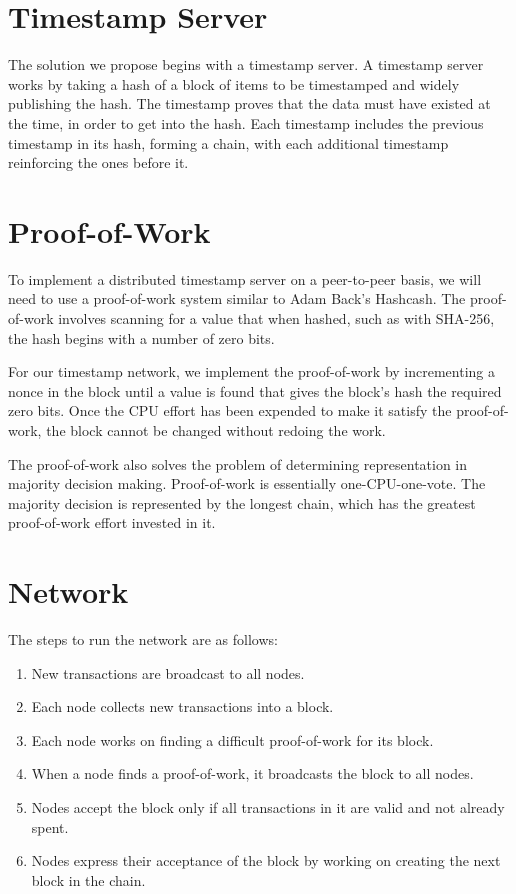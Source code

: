 \documentclass{article}
\begin{document}
\section{Timestamp Server}

The solution we propose begins with a timestamp server. A timestamp server works by taking a hash of a block of items to be timestamped and widely publishing the hash. The timestamp proves that the data must have existed at the time, in order to get into the hash. Each timestamp includes the previous timestamp in its hash, forming a chain, with each additional timestamp reinforcing the ones before it.

\section{Proof-of-Work}

To implement a distributed timestamp server on a peer-to-peer basis, we will need to use a proof-of-work system similar to Adam Back's Hashcash. The proof-of-work involves scanning for a value that when hashed, such as with SHA-256, the hash begins with a number of zero bits.

For our timestamp network, we implement the proof-of-work by incrementing a nonce in the block until a value is found that gives the block's hash the required zero bits. Once the CPU effort has been expended to make it satisfy the proof-of-work, the block cannot be changed without redoing the work.

The proof-of-work also solves the problem of determining representation in majority decision making. Proof-of-work is essentially one-CPU-one-vote. The majority decision is represented by the longest chain, which has the greatest proof-of-work effort invested in it.

\section{Network}

The steps to run the network are as follows:

\begin{enumerate}
\item New transactions are broadcast to all nodes.
\item Each node collects new transactions into a block.
\item Each node works on finding a difficult proof-of-work for its block.
\item When a node finds a proof-of-work, it broadcasts the block to all nodes.
\item Nodes accept the block only if all transactions in it are valid and not already spent.
\item Nodes express their acceptance of the block by working on creating the next block in the chain.
\end{enumerate}
\end{document}
